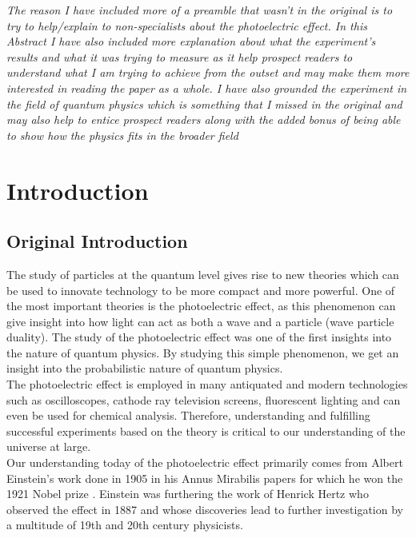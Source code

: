 \documentclass[12pt]{article}
\begin{document}
\textit{The reason I have included more of a preamble that wasn't in the original is to try to help/explain to non-specialists about the photoelectric effect. In this Abstract I have also included more explanation about what the experiment's results and what it was trying to measure as it help prospect readers to understand what I am trying to achieve from the outset and may make them more interested in reading the paper as a whole. I have also grounded the experiment in the field of quantum physics which is something that I missed in the original and may also help to entice prospect readers along with the added bonus of being able to show how the physics fits in the broader field}

\section {Introduction}
\subsection{Original Introduction }
 The study of particles at the quantum level gives rise to new theories which can be used to innovate
technology to be more compact and more powerful. One of the most important theories is the photoelectric effect, as this phenomenon can give insight into how light can act as both a wave and a
particle (wave particle duality). The study of the photoelectric effect was one of the first insights into the nature of quantum physics. By studying this simple phenomenon, we get an insight into the probabilistic nature of quantum physics.\\

The photoelectric effect is employed in many antiquated and modern technologies such as oscilloscopes, cathode ray television screens, fluorescent lighting and can even be used for chemical analysis. Therefore, understanding and fulfilling successful experiments based on the theory is critical to our understanding of the universe at large.\\

Our understanding today of the photoelectric effect primarily comes from Albert Einstein’s work done in 1905 in his Annus Mirabilis papers \cite{Einstein 1905} for which he won the 1921 Nobel prize \cite{1921 Nobel}. Einstein was furthering the work of Henrick Hertz \cite{Hertz} who observed the effect in 1887 and whose discoveries lead to further investigation by a multitude of 19th and 20th century physicists.
\end{document}
